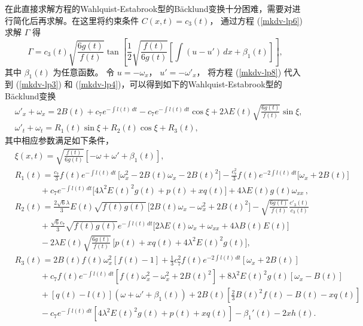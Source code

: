 在此直接求解方程的Wahlquist-Estabrook型的B\"{a}cklund变换十分困难，需要对进行简化后再求解。在这里将约束条件 $C(x,t)=c_3(t)$， 通过方程 (\ref{mkdv-lp6}) 求解 $\Gamma$ 得
\begin{equation}
\Gamma=c_3(t)\sqrt{\frac{6g(t)}{f(t)}} \tan \left[ \frac{1}{2} \sqrt{\frac{f(t)}{6 g(t)}} [\int (u-u') \, dx+\beta_1(t)]\right] ,\label{mkdv-lp8}
\end{equation}
其中 $\beta_1(t)$ 为任意函数。
令 $u=-\omega_x$， $u'=-\omega'_x$， 将方程 (\ref{mkdv-lp8}) 代入到 (\ref{mkdv-lp3}) 和 (\ref{mkdv-lp4})，可以得到如下的Wahlquist-Estabrook型的B\"{a}cklund变换
\begin{align}
& \omega'_x+\omega_x=2 B(t)+c_7 e^{-\int l(t)\, dt}-c_7 e^{-\int l(t) \, dt} \cos \xi  +2 \lambda  E(t) \sqrt{\frac{6g(t)}{f(t)}} \sin \xi , \label{mkdv-lp8-1}  \\
& \omega'_t+\omega_t= R_1(t) \sin \xi+ R_2(t) \cos \xi +R_3(t)  , \label{mkdv-lp9}
\end{align}
其中相应参数满足如下条件，
\begin{align}
& \xi(x,t)=\sqrt{\frac{f(t)}{6g(t)}} [-\omega+\omega'+\beta_1(t)],\nonumber \\
\nonumber
& R_1(t)= \frac{ c_7}{3}f(t)e^{-\int l(t) \, dt} \, \big[\omega_x^2 -2 B(t)  \omega_x -2B(t)^2 \big]
-\frac{c_7^2}{3}f(t) e^{-2 \int l(t) \, dt} \big[ \omega_x
+2B(t)\big]
\\ \nonumber
&\quad\quad\quad
+ c_7 e^{-\int l(t) \, dt}\big[4\lambda ^2 E(t)^2 g(t) + p(t) + x q(t) \big]+4 \lambda  E(t) g(t) \omega_{xx}\, ,
\\ \nonumber
& R_2(t)= \frac{2 \sqrt{6}  \lambda } {3} E(t) \sqrt{f(t) g(t)}\, \big[ 2B(t)  \omega_x - \omega_x^2+2 B(t)^2 \big]-\sqrt{\frac{6g(t)}{f(t)}}\frac{c'_3(t)}{c_3(t)}\\ \nonumber
& \quad\quad\quad
+\frac{\sqrt{6}c_7}{3}\sqrt{f(t) g(t)} e^{-\int l(t) \, dt}
\big[2 \lambda  E(t) \omega_x +\omega_{xx}+4\lambda  B(t) E(t) \big]
\\ \nonumber
& \quad\quad\quad
 -2 \lambda E(t) \sqrt{\frac{6g(t)}{f(t)}}\,\big[ p(t)   +  x  q(t)  + 4  \lambda ^2 E(t)^2 g(t) \big],
 \\ \nonumber
& R_3(t)= 2 B(t) f(t) \omega_x^2[f(t)-1] +\frac{1}{3} c_7^2 f(t)  e^{-2 \int l(t) \, dt}[\omega_x+2B(t)]\\ \nonumber
& \quad\quad\quad +c_7 f(t) e^{-\int l(t) \, dt}[f(t)  \omega_x^2-\omega_x^2+2B(t)^2]+8 \lambda ^2 E(t)^2 g(t) [\omega_x- B(t)] \\ \nonumber
& \quad\quad\quad
+[q(t)-l(t)](\omega+\omega'+\beta_1(t))
 +2B(t)[\frac{2}{3} B(t)^2 f(t)- B(t) - x  q(t)]
\\ \nonumber
& \quad\quad\quad - c_7 e^{-\int l(t) \, dt}[4\lambda ^2 E(t)^2 g(t) + p(t) + x q(t)]-\beta_1'(t)-2 x h(t).
\end{align}
